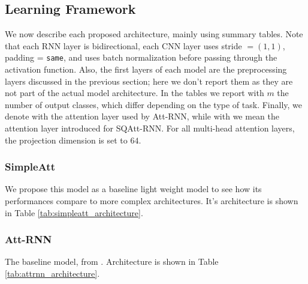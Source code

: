 \subsection{Learning Framework}
\label{sec:learning_framework}

We now describe each proposed architecture, mainly using summary tables. Note that each RNN layer is bidirectional, each CNN layer uses stride $=(1,1)$, padding = \verb|same|, and uses batch normalization before passing through the activation function. Also, the first layers of each model are the preprocessing layers discussed in the previous section; here we don't report them as they are not part of the actual model architecture. In the tables we report with $m$ the number of output classes, which differ depending on the type of task. Finally, we denote with  the attention layer used by Att-RNN, while with  we mean the attention layer introduced for SQAtt-RNN. For all multi-head attention layers, the projection dimension is set to $64$.

\subsubsection{\textbf{SimpleAtt}}
We propose this model as a baseline light weight model to see how its performances compare to more complex architectures. It's architecture is shown in Table \ref{tab:simpleatt_architecture}.

\begin{table}[h!]
	\caption{Simple Attention RNN architecture}
	\label{tab:simpleatt_architecture}
\end{table}
\subsubsection{\textbf{Att-RNN}}
The baseline model, from \cite{attention2018andreade}. Architecture is shown in Table \ref{tab:attrnn_architecture}.

